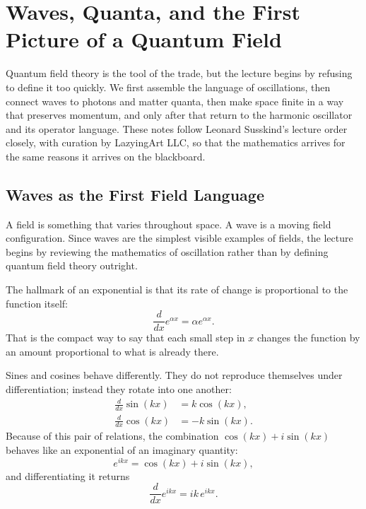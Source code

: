\chapter{Waves, Quanta, and the First Picture of a Quantum Field}

Quantum field theory is the tool of the trade, but the lecture begins by refusing to define it too quickly. We first assemble the language of oscillations, then connect waves to photons and matter quanta, then make space finite in a way that preserves momentum, and only after that return to the harmonic oscillator and its operator language. These notes follow Leonard Susskind's lecture order closely, with curation by LazyingArt LLC, so that the mathematics arrives for the same reasons it arrives on the blackboard.

\section{Waves as the First Field Language}

A field is something that varies throughout space. A wave is a moving field configuration. Since waves are the simplest visible examples of fields, the lecture begins by reviewing the mathematics of oscillation rather than by defining quantum field theory outright.

The hallmark of an exponential is that its rate of change is proportional to the function itself:
\begin{equation}
\frac{d}{dx}e^{\alpha x}=\alpha e^{\alpha x}.
\end{equation}
That is the compact way to say that each small step in \(x\) changes the function by an amount proportional to what is already there.

Sines and cosines behave differently. They do not reproduce themselves under differentiation; instead they rotate into one another:
\begin{align}
\frac{d}{dx}\sin(kx)&=k\cos(kx),\\
\frac{d}{dx}\cos(kx)&=-k\sin(kx).
\end{align}
Because of this pair of relations, the combination \(\cos(kx)+i\sin(kx)\) behaves like an exponential of an imaginary quantity:
\begin{equation}
e^{ikx}=\cos(kx)+i\sin(kx),
\end{equation}
and differentiating it returns
\begin{equation}
\frac{d}{dx}e^{ikx}=ik\,e^{ikx}.
\end{equation}

